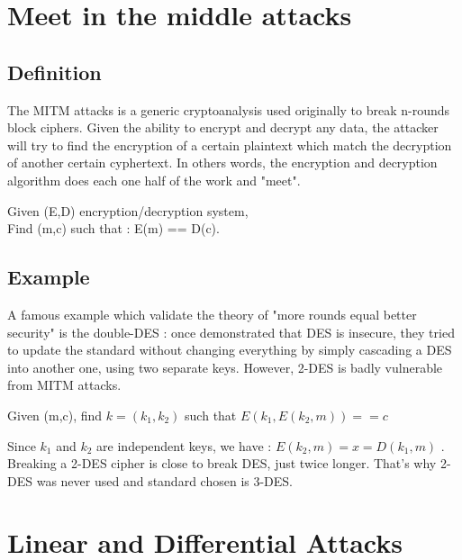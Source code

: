 \section{Meet in the middle attacks}

\subsection{Definition}
The MITM attacks is a generic cryptoanalysis used originally to break n-rounds block ciphers. Given the ability to encrypt and decrypt any data, the attacker will try to find the encryption of a certain plaintext which match the decryption of another certain cyphertext. In others words, the encryption and decryption algorithm does each one half of the work and "meet".

\begin{mydef}
\begin{minipage}[t]{0.8\textwidth}
	Given (E,D) encryption/decryption system, \\
    Find (m,c) such that : E(m) == D(c).
\end{minipage}
\end{mydef}

\subsection{Example}

A famous example which validate the theory of "more rounds equal better security" is the double-DES : once demonstrated that DES is insecure, they tried to update the standard without changing everything by simply cascading a DES into another one, using two separate keys. However, 2-DES is badly vulnerable from MITM attacks.

\begin{mydef}[Challenge]
\begin{minipage}[t]{0.8\textwidth}
	Given (m,c), find $k = (k_1,k_2)$ such that $E(k_1,E(k_2,m)) == c$
\end{minipage}
\end{mydef}

Since $k_1$ and $k_2$ are independent keys, we have : $E(k_2,m) = x = D(k_1,m) $ . Breaking a 2-DES cipher is close to break DES, just twice longer. That's why 2-DES was never used and standard chosen is 3-DES.

\section{Linear and Differential Attacks}

